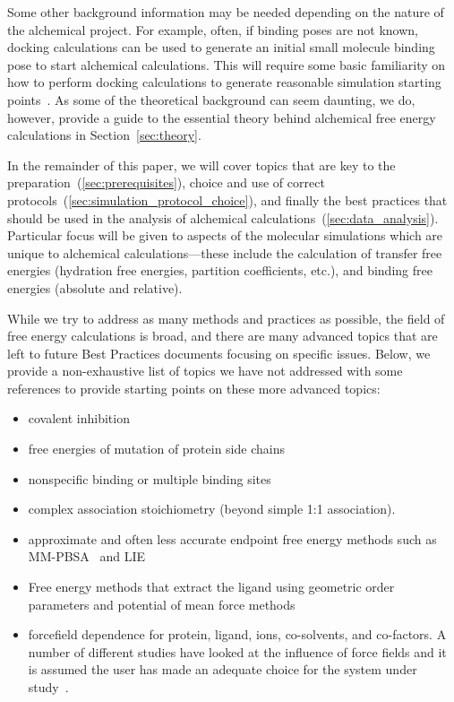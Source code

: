 \documentclass[9pt,bestpractices]{livecoms}
\begin{document}
Some other background information may be needed depending on the nature of the alchemical project. For example, often, if binding poses are not known, docking calculations can be used to generate an initial small molecule binding pose to start alchemical calculations. This will require some basic familiarity on how to perform docking calculations to generate reasonable simulation starting points~\cite{grinter2014challenges}. 
%
As some of the theoretical background can seem daunting, we do, however, provide a guide to the essential theory behind alchemical free energy calculations in Section~\ref{sec:theory}.

In the remainder of this paper, we will cover topics that are key to the preparation~(\ref{sec:prerequisites}), choice and use of correct protocols~(\ref{sec:simulation_protocol_choice}), and finally the best practices that should be used in the analysis of alchemical calculations~(\ref{sec:data_analysis}). 
Particular focus will be given to aspects of the molecular simulations which are unique to alchemical calculations---these include the calculation of transfer free energies (hydration free energies, partition coefficients, etc.), and binding free energies (absolute and relative).
%

While we try to address as many methods and practices as possible, the field of free energy calculations is broad, and there are many advanced topics that are left to future Best Practices documents focusing on specific issues. 
Below, we provide a non-exhaustive list of topics we have not addressed with some references to provide starting points on these more advanced topics:
\begin{itemize}
\item covalent inhibition~\cite{lameira2019predicting}
\item free energies of mutation of protein side chains~\cite{gapsys2016accurate, aldeghi2018accurate}
\item nonspecific binding or multiple binding sites~\cite{gill2018binding}
\item complex association stoichiometry (beyond simple 1:1 association).
\item approximate and often less accurate endpoint free energy methods such as MM-PBSA~\cite{genheden2015mm} and LIE~\cite{gutierrez-de-teran2012linear}
\item Free energy methods that extract the ligand using geometric order parameters and potential of mean force methods~\cite{heinzelmann2017attachpullrelease}
\item forcefield dependence for protein, ligand, ions, co-solvents, and co-factors. A number of different studies have looked at the influence of force fields and it is assumed the user has made an adequate choice for the system under study~\cite{loeffler2018reproducibility, vassetti2019assessment, lopes2015current}. 
\end{itemize}
%
\end{document}
